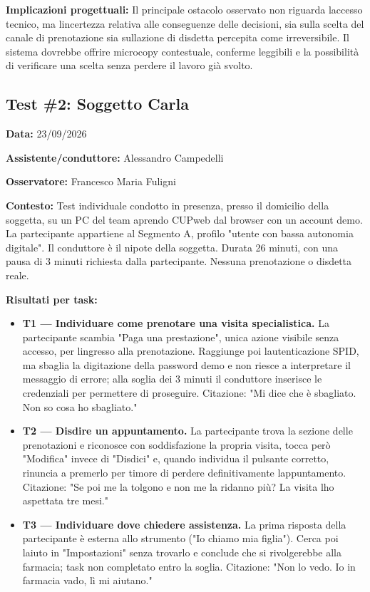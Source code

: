\textbf{Implicazioni progettuali:} Il principale ostacolo
osservato non riguarda l\textquotesingle accesso tecnico, ma
l\textquotesingle incertezza relativa alle conseguenze delle
decisioni, sia sulla scelta del canale di prenotazione
sia sull\textquotesingle azione di disdetta percepita
come irreversibile. Il sistema dovrebbe offrire
microcopy contestuale, conferme leggibili e la possibilità di
verificare una scelta senza perdere il lavoro già svolto.

\subsection{Test \#2: Soggetto Carla}

\textbf{Data:} 23/09/2026

\textbf{Assistente/conduttore:} Alessandro Campedelli

\textbf{Osservatore:} Francesco Maria Fuligni

\textbf{Contesto:} Test individuale condotto in presenza, presso il
domicilio della soggetta, su un PC del team
aprendo CUPweb dal browser con un account demo.
La partecipante appartiene al Segmento A, profilo "utente con bassa autonomia
digitale". Il conduttore è il nipote della soggetta. Durata 26 minuti,
con una pausa di 3 minuti richiesta dalla partecipante. Nessuna
prenotazione o disdetta reale.

\textbf{Risultati per task:}

\begin{itemize}
\item
  \textbf{T1 --- Individuare come prenotare una visita specialistica.}
  La partecipante scambia "Paga
  una prestazione", unica azione visibile senza accesso, per
  l\textquotesingle ingresso alla prenotazione. Raggiunge poi
  l\textquotesingle autenticazione SPID, ma sbaglia la digitazione
  della password demo e non riesce a interpretare il messaggio di
  errore; alla soglia dei 3 minuti il conduttore inserisce le
  credenziali per permettere di proseguire. Citazione: "Mi dice che è
  sbagliato. Non so cosa ho sbagliato."
\item
  \textbf{T2 --- Disdire un appuntamento.} La partecipante trova la sezione delle
  prenotazioni e riconosce con soddisfazione la propria visita, tocca
  però "Modifica" invece di "Disdici" e, quando individua il pulsante
  corretto, rinuncia a premerlo per timore di perdere definitivamente
  l\textquotesingle appuntamento. Citazione: "Se poi me la tolgono e
  non me la ridanno più? La visita l\textquotesingle ho aspettata tre
  mesi."
\item
  \textbf{T3 --- Individuare dove chiedere assistenza.} La prima risposta della partecipante è
  esterna allo strumento ("Io chiamo mia figlia"). Cerca poi
  l\textquotesingle aiuto in "Impostazioni" senza trovarlo e conclude
  che si rivolgerebbe alla farmacia; task non completato entro la
  soglia. Citazione: "Non lo vedo. Io in farmacia vado, lì mi
  aiutano."
\end{itemize}

